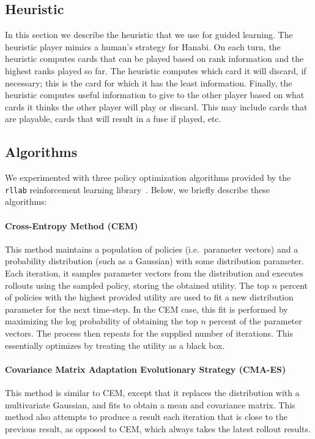 \subsection{Heuristic}

In this section we describe the heuristic that we use for guided learning.  The
heuristic player mimics a human's strategy for Hanabi. On each turn, the
heuristic computes cards that can be played based on rank information and the
highest ranks played so far. The heuristic computes which card it will
discard, if necessary; this is the card for which it has the least information.
Finally, the heuristic computes useful information to give to the other player
based on what cards it thinks the other player will play or discard. This may
include cards that are playable, cards that will result in a fuse if played,
etc.

\subsection{Algorithms}
We experimented with three policy optimization algorithms provided by the
\texttt{rllab} reinforcement learning library~\cite{duan2016benchmarking}.
Below, we briefly describe these algorithms:

\paragraph{Cross-Entropy Method (CEM)~\cite{rubinstein2013cross,
policyoptimizationNIPS2016}}
This method maintains a population of policies (i.e.\ parameter vectors) and a
probability distribution (such as a Gaussian) with some distribution parameter.
Each iteration, it samples parameter vectors from the distribution and executes
rollouts using the sampled policy, storing the obtained utility.  The top $n$
percent of policies with the highest provided utility are used to fit a new
distribution parameter for the next time-step. In the CEM case, this fit is
performed by maximizing the log probability of obtaining the top $n$ percent of
the parameter vectors. The process then repeats for the supplied number of
iterations. This essentially optimizes by treating the utility as a black box.

\paragraph{Covariance Matrix Adaptation Evolutionary Strategy
(CMA-ES)~\cite{cmaes, policyoptimizationNIPS2016}}
This method is similar to CEM, except that it replaces the distribution with a
multivariate Gaussian, and fits to obtain a mean and covariance matrix.  This
method also attempts to produce a result each iteration that is close to the
previous result, as opposed to CEM, which always takes the latest rollout
results.

